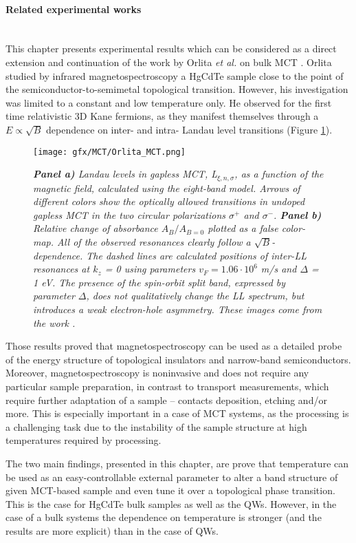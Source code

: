 \documentclass[titlepage,a4paper]{book}
\newcommand{\wciecie}{\quad\phantom{v}}
\newcommand{\myparagraph}[1]{\paragraph{#1}\mbox{}\\}
\begin{document}
\myparagraph{Related experimental works}
\wciecie
This chapter presents experimental results which can be considered as a direct extension and continuation of the work by Orlita \textit{et al.} on bulk MCT \cite{Orlita_MCT}. Orlita studied by infrared magnetospectroscopy a HgCdTe sample close to the point of the semiconductor-to-semimetal topological transition. However, his investigation was limited to a constant and low temperature only. He observed for the first time relativistic 3D Kane fermions, as they manifest themselves through a $E \propto \sqrt{B}$ dependence on inter- and intra- Landau level transitions (Figure \ref{fig:Orlita_MCT}). 

\begin{figure}[ht]
	\centering
	\texttt{[image: gfx/MCT/Orlita\_MCT.png]}
	\vspace{-10pt}
	\caption{\textit{\textbf{Panel a)} Landau levels in gapless MCT, L$_{\xi,n,\sigma}$, as a function of the magnetic field, calculated using the eight-band model. Arrows of different colors show the optically allowed transitions in undoped gapless MCT in the two circular polarizations $\sigma^{+}$ and $\sigma^{-}$. \textbf{Panel b)} Relative change of absorbance $A_B/A_{B=0}$ plotted as a false color-map. All of the observed resonances clearly follow a $\sqrt{B}$-dependence. The dashed lines are calculated positions of inter-LL resonances at $k_z$ = 0 using parameters $v_F = 1.06 \cdot 10^6$ m/s and $\Delta$ = 1 eV. The presence of the spin-orbit split band, expressed by parameter $\Delta$, does not qualitatively change the LL spectrum, but introduces a weak electron-hole asymmetry. These images come from the work \cite{Orlita_MCT}.}}
	\label{fig:Orlita_MCT}
\end{figure}

Those results proved that magnetospectroscopy can be used as a detailed probe of the energy structure of topological insulators and narrow-band semiconductors. Moreover, magnetospectroscopy is noninvasive and does not require any particular sample preparation, in contrast to transport measurements, which require further adaptation of a sample -- contacts deposition, etching and/or more. This is especially important in a case of MCT systems, as the processing is a challenging task due to the instability of the sample structure at high temperatures required by processing.

The two main findings, presented in this chapter, are prove that temperature can be used as an easy-controllable external parameter to alter a band structure of given MCT-based sample and even tune it over a topological phase transition. This is the case for HgCdTe bulk samples as well as the QWs. However, in the case of a bulk systems the dependence on temperature is stronger (and the results are more explicit) than in the case of QWs. 
\end{document}
